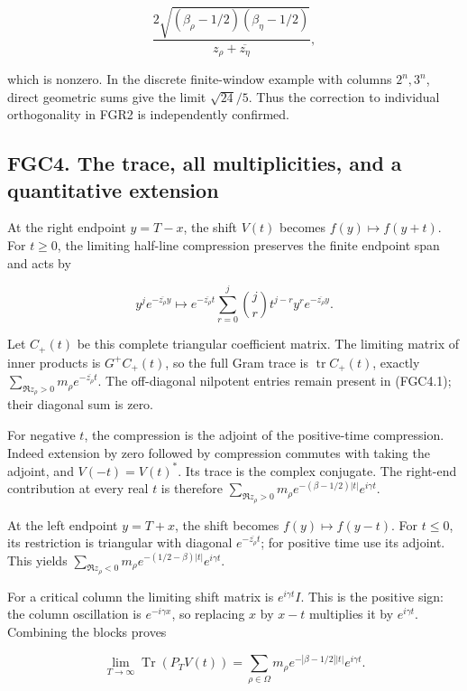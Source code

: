 \[
 \frac{2\sqrt{(\beta_\rho-1/2)(\beta_\eta-1/2)}}
 {z_\rho+\overline{z_\eta}},
\tag{FGC3.4}
\]

which is nonzero. In the discrete finite-window example with columns
\(2^n,3^n\), direct geometric sums give the limit \(\sqrt{24}/5\). Thus
the correction to individual orthogonality in FGR2 is independently
confirmed.

\subsection{FGC4. The trace, all multiplicities, and a quantitative
extension}\label{fgc4.-the-trace-all-multiplicities-and-a-quantitative-extension}

At the right endpoint \(y=T-x\), the shift \(V(t)\) becomes
\(f(y)\mapsto f(y+t)\). For \(t\geq0\), the limiting half-line
compression preserves the finite endpoint span and acts by

\[
 y^j e^{-\overline{z_\rho}y}
 \longmapsto e^{-\overline{z_\rho}t}
 \sum_{r=0}^j\binom jr t^{j-r}y^r e^{-\overline{z_\rho}y}.
\tag{FGC4.1}
\]

Let \(C_+(t)\) be this complete triangular coefficient matrix. The
limiting matrix of inner products is \(G^+C_+(t)\), so the full Gram
trace is \(\operatorname{tr}C_+(t)\), exactly
\(\sum_{\Re z_\rho>0}m_\rho e^{-\overline{z_\rho}t}\). The off-diagonal
nilpotent entries remain present in (FGC4.1); their diagonal sum is
zero.

For negative \(t\), the compression is the adjoint of the positive-time
compression. Indeed extension by zero followed by compression commutes
with taking the adjoint, and \(V(-t)=V(t)^*\). Its trace is the complex
conjugate. The right-end contribution at every real \(t\) is therefore
\(\sum_{\Re z_\rho>0}m_\rho e^{-(\beta-1/2)|t|}e^{i\gamma t}\).

At the left endpoint \(y=T+x\), the shift becomes
\(f(y)\mapsto f(y-t)\). For \(t\leq0\), its restriction is triangular
with diagonal \(e^{-\overline{z_\rho}t}\); for positive time use its
adjoint. This yields
\(\sum_{\Re z_\rho<0}m_\rho e^{-(1/2-\beta)|t|}e^{i\gamma t}\).

For a critical column the limiting shift matrix is \(e^{i\gamma t}I\).
This is the positive sign: the column oscillation is \(e^{-i\gamma x}\),
so replacing \(x\) by \(x-t\) multiplies it by \(e^{i\gamma t}\).
Combining the blocks proves

\[
 \lim_{T\to\infty}\operatorname{Tr}(P_TV(t))
 =\sum_{\rho\in\Omega}m_\rho
 e^{-|\beta-1/2||t|}e^{i\gamma t}.
\tag{FGC4.2}
\]

